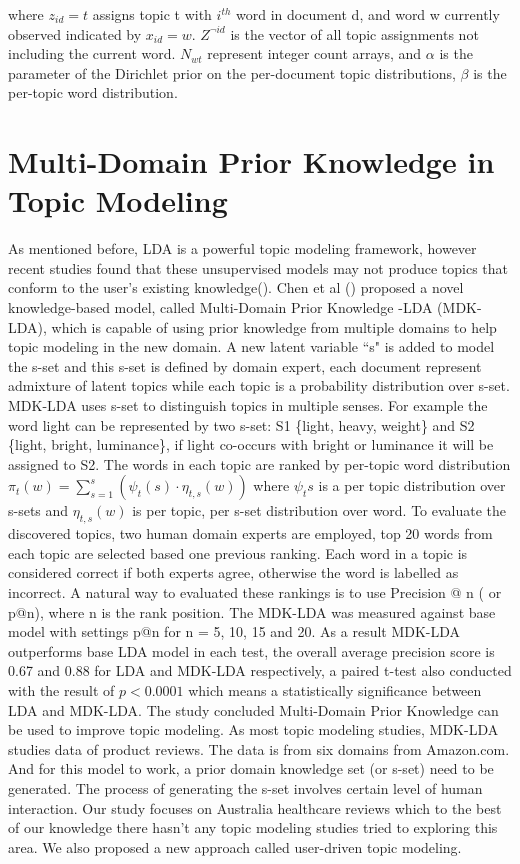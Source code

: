 \documentclass[11pt,twoside]{report}
\begin{document}
where $z_{id}=t$ assigns topic t with $i^{th}$ word in document d, and word w currently observed indicated by $x_{id}=w$.
$Z^{\neg id}$ is the vector of all topic assignments not including the current word. $N_{wt}$ represent integer count arrays, and $\alpha$ is the parameter of the Dirichlet prior on the per-document topic distributions, $\beta$ is the per-topic word distribution.

\section{Multi-Domain Prior Knowledge in Topic Modeling}
As mentioned before, LDA is a powerful topic modeling framework, however recent 
studies found that these unsupervised models may not produce topics that conform to 
the user's existing knowledge(\cite{ref24}). Chen et al (\cite{ref24}) proposed a 
novel knowledge-based model, called Multi-Domain Prior Knowledge -LDA (MDK-LDA), which is capable of using prior knowledge 
from multiple domains to help topic modeling in the new domain. 
A new latent variable ``s" is added to model the s-set and this s-set is defined by domain expert, each document represent 
admixture of latent topics while each topic is a probability distribution over s-set. 
MDK-LDA uses s-set to distinguish topics in multiple senses. 
For example the word light can be represented by two s-set: S1 \{light, heavy, weight\} and S2 \{light, bright, luminance\}, if light co-occurs with bright or 
luminance it will be assigned to S2.
The words in each topic are ranked by per-topic word distribution $\pi _{t}(w) = \sum_{s=1}^s (\psi_{t}(s)\cdot \eta_{t,s}(w) )$ where $\psi_t{s}$ is a per topic distribution over s-sets and $\eta_{t,s}(w)$ is per topic, per s-set distribution over word. To evaluate the discovered topics, two human domain experts are employed, top 20 words from each topic are selected based one previous ranking. Each word in a topic is considered correct if both experts agree, otherwise the word is labelled as incorrect. A natural way to evaluated these rankings is to use Precision @ n ( or p@n), where n is the rank position. The MDK-LDA was measured against base model with settings p@n for n = 5, 10, 15 and 20. As a result MDK-LDA outperforms base LDA model in each test, the overall average precision score is 0.67 and 0.88 for LDA and MDK-LDA respectively, a paired t-test also conducted with the result of $p < 0.0001$ which means a statistically significance  between LDA and MDK-LDA. The study concluded Multi-Domain Prior Knowledge can be used to improve topic modeling. 
As most topic modeling studies, MDK-LDA studies data of product reviews. The data is from six domains from Amazon.com. And for this model to work, a prior domain knowledge set (or s-set) need to be generated. The process of generating the s-set involves certain level of human interaction. Our study focuses on Australia healthcare reviews which to the best of our knowledge there hasn't any topic modeling studies tried to exploring this area. We also proposed a new approach called user-driven topic modeling.
\end{document}
